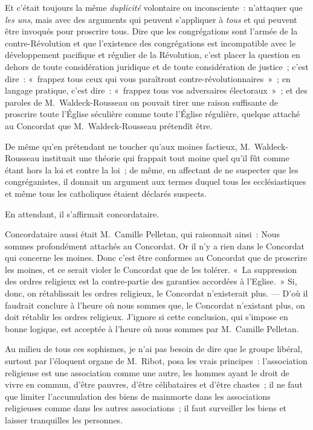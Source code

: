 \documentclass[french,twoside]{book} %
\begin{document}
Et c’était toujours la même {\itshape duplicité} volontaire ou inconsciente : n’attaquer que {\itshape les uns}, mais avec des arguments qui peuvent s’appliquer à {\itshape tous} et qui peuvent être invoqués pour proscrire tous. Dire que les congrégations sont l’armée de la contre-Révolution et que l’existence des congrégations est incompatible avec le développement pacifique et régulier de la Révolution, c’est placer la question en dehors de toute considération juridique et de toute considération de justice ; c’est dire : « frappez tous ceux qui vous paraîtront contre-révolutionnaires » ; en langage pratique, c’est dire : « frappez tous vos adversaires électoraux » ;  et des paroles de M. Waldeck-Rousseau on pouvait tirer une raison suffisante de proscrire toute l’Église séculière comme toute l’Église régulière, quelque attaché au Concordat que M. Waldeck-Rousseau prétendît être.\par
De même qu’en prétendant ne toucher qu’aux moines factieux, M. Waldeck-Rousseau instituait une théorie qui frappait tout moine quel qu’il fût comme étant hors la loi et contre la loi ; de même, en affectant de ne suspecter que les congréganistes, il donnait un argument aux termes duquel tous les ecclésiastiques et même tous les catholiques étaient déclarés suspects.\par
En attendant, il s’affirmait concordataire.\par
Concordataire aussi était M. Camille Pelletan, qui raisonnait ainsi : Nous sommes profondément attachés au Concordat. Or il n’y a rien dans le Concordat qui concerne les moines. Donc c’est être conformes au Concordat que de proscrire les moines, et ce serait violer le Concordat que de les tolérer. « La suppression des ordres religieux est la contre-partie des garanties accordées à l’Eglise. » Si, donc, on rétablissait les ordres religieux, le Concordat n’existerait plus. — D’où il faudrait conclure à l’heure où nous sommes que, le Concordat n’existant plus, on doit rétablir les ordres religieux. J’ignore si cette conclusion, qui s’impose en bonne  logique, est acceptée à l’heure où nous sommes par M. Camille Pelletan.\par
Au milieu de tous ces sophismes, je n’ai pas besoin de dire que le groupe libéral, surtout par l’éloquent organe de M. Ribot, posa les vrais principes : l’association religieuse est une association comme une autre, les hommes ayant le droit de vivre en commun, d’être pauvres, d’être célibataires et d’être chastes ; il ne faut que limiter l’accumulation des biens de mainmorte dans les associations religieuses comme dans les autres associations ; il faut surveiller les biens et laisser tranquilles les personnes.\par
\end{document}
